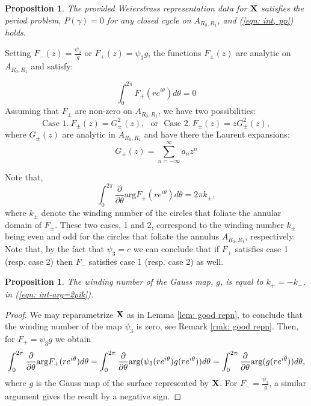 \documentclass[11pt]{amsart}
\numberwithin{equation}{section}
\theoremstyle{theorem}
\newtheorem{proposition}[theorem]{Proposition}
\theoremstyle{definition}
\numberwithin{equation}{section}
\begin{document}
\begin{proposition}
    The provided Weierstrass representation data for $\bold{X}$ satisfies the period problem, $P(\gamma)=0$ for any closed cycle on $A_{R_0,R_1}$, and (\ref{eqn: int, pp}) holds.  
\end{proposition}

Setting $F_-(z) = \frac{\psi_3}{g} $  or $F_+(z) = \psi_3 g $, the functions $F_{\pm}(z)$ are analytic on $A_{R_0,R_1}$ and satisfy:

\begin{equation} \label{eqn: int F =0}
\int_{0}^{2\pi} F_{\pm}(re^{i\theta} )d\theta =0 
\end{equation}
Assuming that $F_{\pm}$ are non-zero on $A_{R_0,R_1}$, we have two possibilities:
\begin{equation}
    \text{Case 1.}\ F_{\pm}(z)=G_{\pm}^2(z),\ \ \ \text{or}\ \ \ \text{Case 2.}\ F_{\pm}(z)=zG_{\pm}^2(z),
\end{equation}  
where $G_{\pm}(z)$ are analytic in $A_{R_0,R_1}$ and have there the Laurent expansions:
\begin{equation}
    \nonumber
    G_{\pm}(z) = \underset{n=-\infty }{\overset{\infty}{\sum}} a_n z^n
\end{equation}

Note that, 
\begin{equation}\label{eqn: int-arg=2pik}
    \int_{0}^{2\pi} \frac{\partial}{\partial \theta} \text{arg} F_{\pm}(re^{i\theta}) d\theta =2\pi k_{\pm},
\end{equation}
where $k_{\pm}$ denote the winding number of the circles that foliate the annular domain of $F_{\pm}$.
These two cases, 1 and 2, correspond to the winding number $k_{\pm}$ being even and odd for the circles that foliate the annulus $A_{R_0,R_1}$, respectively. 
Note that, by the fact that $\psi_3=c$ we can conclude that if $F_+$ satisfies case 1 (resp. case 2) then $F_-$ satisfies case 1 (resp. case 2) as well. 
\medskip

\begin{proposition}
    The winding number of the Gauss map, $g$, is equal to $k_+=-k_-$, in (\ref{eqn: int-arg=2pik}).
\end{proposition}
\begin{proof} We may reparametrize $\bold{X}$ as in Lemma \ref{lem: good repn}, to conclude that the winding number of the map $\psi_3$ is zero, see Remark \ref{rmk: good repn}. Then, for $F_+=\psi_3 g$ we obtain
    $$
    \int_{0}^{2\pi} \frac{\partial}{\partial \theta} \text{arg} F_+(re^{i\theta}) d\theta = \int_{0}^{2\pi} \frac{\partial}{\partial \theta} \text{arg} (\psi_3 (re^{i\theta})g(re^{i\theta})) d\theta \\ 
    = \int_{0}^{2\pi} \frac{\partial}{\partial \theta} \text{arg} (g(re^{i\theta})) d\theta , 
    $$ 
   where $g$ is the Gauss map of the surface represented by $\bold{X}$.
    For $F_-=\frac{\psi_3}{g}$, a similar argument gives the result by a negative sign.
\end{proof}
\medskip
\end{document}
